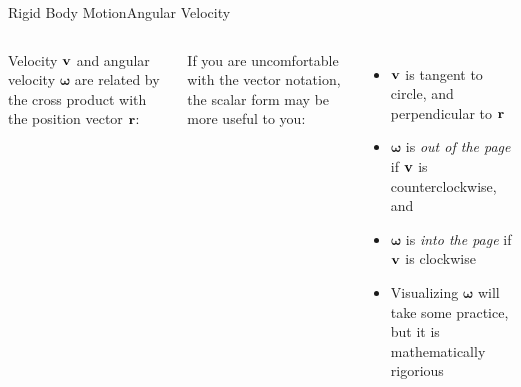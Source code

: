 \documentclass[12pt,compress,aspectratio=169]{beamer}
\newcommand{\mb}[1]{\ensuremath\mathbf{#1}}
\newcommand{\eq}[2]{\vspace{#1}{\Large\begin{displaymath}#2\end{displaymath}}}
\begin{document}
\begin{frame}{Rigid Body Motion}{Angular Velocity}
  \begin{columns}


    Velocity $\mb{v}$ and angular velocity $\bm{\omega}$ are related by the
    cross product with the position vector $\mb{r}$:

    \eq{-.25in}{
      \boxed{\mb{v}=\bm{\omega}\times\mb{r}}
    }

    \vspace{-.15in}If you are uncomfortable with the vector notation, the
    scalar form may be more useful to you:
    
    \eq{-.3in}{
      \boxed{v=r\omega}
    }    
    \begin{itemize}
    \item\vspace{-.25in}$\mb{v}$ is tangent to circle, and
      perpendicular to $\mb{r}$
    \item $\bm{\omega}$ is \emph{out of the page} if $\mb{v}$ is
      counterclockwise, and
    \item $\bm{\omega}$ is \emph{into the page} if $\mb{v}$ is clockwise
    \item Visualizing $\bm{\omega}$ will take some practice, but it is
      mathematically rigorious
    \end{itemize}
  \end{columns}
\end{frame}
\end{document}
